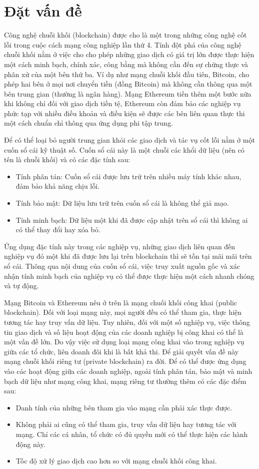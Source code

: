 \documentclass[../DoAn.tex]{subfiles}
\begin{document}
\section{Đặt vấn đề}
\label{section:1.1}
Công nghệ chuỗi khối (blockchain) được cho là một trong những công nghệ cốt lỗi trong cuộc cách mạng công nghiệp lần thứ 4. Tính đột phá của công nghệ chuỗi khối nằm ở việc cho cho phép những giao dịch có giá trị lớn được thực hiện một cách minh bạch, chính xác, công bằng mà không cần đến sự chứng thực và phân xử của một bên thứ ba. Ví dụ như mạng chuỗi khối đầu tiên, Bitcoin, cho phép hai bên ở mọi nơi chuyển tiền (đồng Bitcoin) mà không cần thông qua một bên trung gian (thường là ngân hàng). Mạng Ethereum tiến thêm một bước nữa khi không chỉ đối với giao dịch tiền tệ, Ethereum còn đảm bảo các nghiệp vụ phức tạp với nhiều điều khoản và điều kiện sẽ được các bên liên quan thực thi một cách chuẩn chỉ thông qua ứng dụng phi tập trung.

Để có thể loại bỏ người trung gian khỏi các giao dịch và tác vụ cốt lỗi nằm ở một cuốn sổ cái kỹ thuật số. Cuốn sổ cái này là một chuỗi các khổi dữ liệu (nên có tên là chuỗi khối) và có các đặc tính sau:
\begin{itemize}
	\item Tính phân tán: Cuốn sổ cái được lưu trữ trên nhiều máy tính khác nhau, đảm bảo khả năng chịu lỗi.
	\item Tính bảo mật: Dữ liệu lưu trữ trên cuốn sổ cái là không thể giả mạo.
	\item Tính minh bạch: Dữ liệu một khi đã được cập nhật trên sổ cái thì không ai có thể thay đổi hay xóa bỏ.
\end{itemize}

Ứng dụng đặc tính này trong các nghiệp vụ, những giao dịch liên quan đến nghiệp vụ đó một khi đã được lưu lại trên blockchain thì sẽ tồn tại mãi mãi trên sổ cái. Thông qua nội dung của cuốn sổ cái, việc truy xuất nguồn gốc và xác nhận tính minh bạch của nghiệp vụ có thể được thực hiện một cách nhanh chóng và tự động.

Mạng Bitcoin và Ethereum nêu ở trên là mạng chuối khối công khai (public blockchain). Đối với loại mạng này, mọi người đều có thể tham gia, thực hiện tương tác hay truy vấn dữ liệu. Tuy nhiên, đối với một số nghiệp vụ, việc thông tin giao dịch và số liệu hoạt động của các doanh nghiệp bị công khai có thể là một vấn đề lớn. Do vậy việc sử dụng loại mạng công khai vào trong nghiệp vụ giữa các tổ chức, liên doanh đôi khi là bất khả thi. Để giải quyết vấn đề này mạng chuỗi khối riêng tư (private blockchain) ra đời. Để có thể được ứng dụng vào các hoạt động giữa các doanh nghiệp, ngoài tính phân tán, bảo mật và minh bạch dữ liệu như mạng công khai, mạng riêng tư thường thêm có các đặc điểm sau:
\begin{itemize}
	\item Danh tính của những bên tham gia vào mạng cần phải xác thực được.
	\item Không phải ai cũng có thể tham gia, truy vấn dữ liệu hay tương tác với mạng. Chỉ các cá nhân, tổ chức có đủ quyền mới có thể thực hiện các hành động này.
	\item Tốc độ xử lý giao dịch cao hơn so với mạng chuỗi khối công khai.
\end{itemize}
\end{document}

